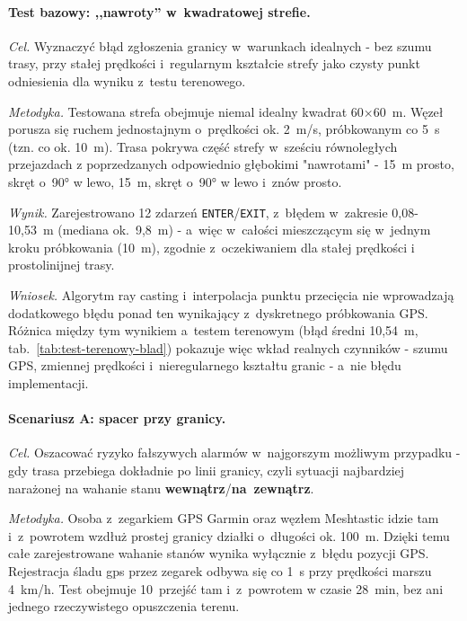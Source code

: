 \paragraph{Test bazowy: ,,nawroty'' w~kwadratowej strefie.}

\textit{Cel.} Wyznaczyć błąd zgłoszenia granicy w~warunkach idealnych - bez szumu trasy, przy stałej
prędkości i~regularnym kształcie strefy  jako czysty punkt odniesienia dla wyniku z~testu terenowego.

\textit{Metodyka.} Testowana strefa obejmuje niemal idealny kwadrat 60$\times$60~m. 
Węzeł porusza się ruchem jednostajnym o~prędkości ok. 2~m/s, próbkowanym co 5~s (tzn. co ok. 10~m). Trasa pokrywa część strefy w~sześciu równoległych
przejazdach z poprzedzanych odpowiednio głębokimi "nawrotami" - 15~m prosto, skręt o~90° w lewo, 15~m, skręt o~90° w lewo i~znów prosto.

\textit{Wynik.} Zarejestrowano 12 zdarzeń \texttt{ENTER}/\texttt{EXIT}, z~błędem w~zakresie
0,08-10,53~m (mediana ok.\ 9,8~m) - a~więc w~całości mieszczącym się w~jednym kroku próbkowania
(10~m), zgodnie z~oczekiwaniem dla stałej prędkości i prostolinijnej trasy.

\textit{Wniosek.} Algorytm ray casting i~interpolacja punktu przecięcia nie wprowadzają
dodatkowego błędu ponad ten wynikający z~dyskretnego próbkowania GPS. Różnica między tym wynikiem
a~testem terenowym (błąd średni 10,54~m, tab.~\ref{tab:test-terenowy-blad}) pokazuje więc wkład
realnych czynników - szumu GPS, zmiennej prędkości i~nieregularnego kształtu granic - a~nie błędu
implementacji.

\paragraph{Scenariusz A: spacer przy granicy.}

\textit{Cel.} Oszacować ryzyko fałszywych alarmów w~najgorszym możliwym przypadku -
gdy trasa przebiega dokładnie po linii granicy, czyli sytuacji najbardziej narażonej na wahanie
stanu \textbf{wewnątrz}/\textbf{na~zewnątrz}.

\textit{Metodyka.} Osoba z~zegarkiem GPS Garmin oraz węzłem Meshtastic idzie tam i~z~powrotem wzdłuż
prostej granicy działki o~długości ok. 100~m. Dzięki temu całe zarejestrowane wahanie stanów wynika wyłącznie z~błędu pozycji GPS. Rejestracja śladu gps przez zegarek odbywa się co 1~s przy prędkości marszu
4~km/h. Test obejmuje 10~przejść tam i~z~powrotem w czasie 28~min, bez ani jednego rzeczywistego opuszczenia terenu.

